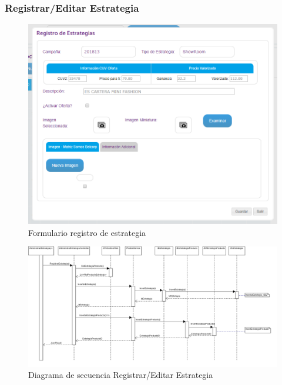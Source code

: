 \documentclass[a4paper,11pt]{paper}
\begin{document}
\subsubsection{Registrar/Editar Estrategia}
\begin{figure}[h]
\centering
\includegraphics[width=1.0\textwidth]{imgs/Estrategia/RegistrarEstrategiaFormulario.png}
\caption{Formulario registro de estrategia}
\end{figure}

\newpage
\begin{landscape}
\begin{figure}[!h]
\centering
\includegraphics[width=1.5\textwidth]{imgs/Estrategia/RegistrarEstrategia.png}
\caption{Diagrama de secuencia Registrar/Editar Estrategia}
\end{figure}
\end{landscape} 


\end{document}
